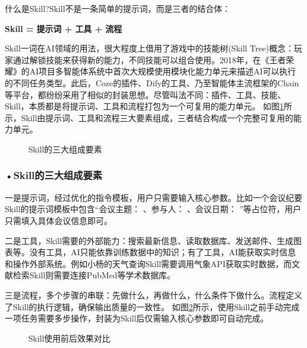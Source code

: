 什么是Skill?Skill不是一条简单的提示词，而是三者的结合体：

\textbf{Skill = 提示词 + 工具 + 流程}

\vfill
\begin{knowledgebox}
Skill一词在AI领域的用法，很大程度上借用了游戏中的技能树(Skill Tree)概念：玩家通过解锁技能来获得新的能力，不同技能可以组合使用。2018年，在《王者荣耀》的AI项目多智能体系统中首次大规模使用模块化能力单元来描述AI可以执行的不同任务类型。此后，Coze的插件、Dify的工具、乃至智能体主流框架的Chain等平台，都纷纷采用了相似的封装思想。尽管叫法不同：插件、工具、技能、Skill，本质都是将提示词、工具和流程打包为一个可复用的能力单元。 如图\ref{fig:ch3_3_12}所示，Skill由提示词、工具和流程三大要素组成，三者结合构成一个完整可复用的能力单元。
\end{knowledgebox}
\vspace{1em}



\begin{figure}[H]
\centering
{}
\caption{Skill的三大组成要素}
\label{fig:ch3_3_12}
\end{figure}

\subsubsection*{\textbf{•Skill的三大组成要素}}


一是提示词，经过优化的指令模板，用户只需要输入核心参数。比如一个会议纪要Skill的提示词模板中包含“会议主题：{ }、参与人：{ }、会议日期：{ }”等占位符，用户只需填入具体会议信息即可。

二是工具，Skill需要的外部能力：搜索最新信息、读取数据库、发送邮件、生成图表等。没有工具，AI只能依靠训练数据中的知识；有了工具，AI能获取实时信息和操作外部系统。例如小杨的天气查询Skill需要调用气象API获取实时数据，而文献检索Skill则需要连接PubMed等学术数据库。

三是流程，多个步骤的串联：先做什么，再做什么，什么条件下做什么。流程定义了Skill的执行逻辑，确保输出质量的一致性。 如图\ref{fig:ch3_3_13}所示，使用Skill之前手动完成一项任务需要多步操作，封装为Skill后仅需输入核心参数即可自动完成。

\begin{figure}[H]
\centering
{}
\caption{Skill使用前后效果对比}
\label{fig:ch3_3_13}
\end{figure}


